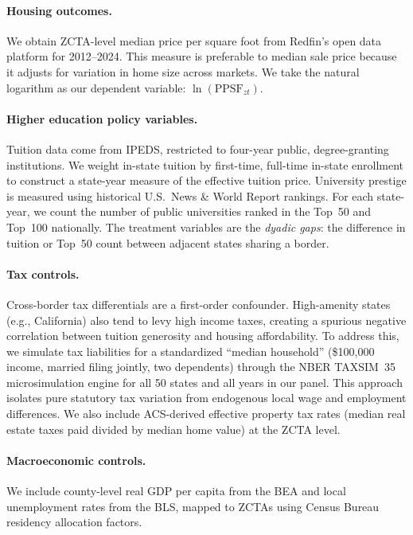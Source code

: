\documentclass[12pt]{article}
\begin{document}
\paragraph{Housing outcomes.} We obtain ZCTA-level median price per square foot from Redfin's open data platform for 2012--2024. This measure is preferable to median sale price because it adjusts for variation in home size across markets. We take the natural logarithm as our dependent variable: $\ln(\text{PPSF}_{zt})$.

\paragraph{Higher education policy variables.} Tuition data come from IPEDS, restricted to four-year public, degree-granting institutions. We weight in-state tuition by first-time, full-time in-state enrollment to construct a state-year measure of the effective tuition price. University prestige is measured using historical U.S.\ News \& World Report rankings. For each state-year, we count the number of public universities ranked in the Top~50 and Top~100 nationally. The treatment variables are the \textit{dyadic gaps}: the difference in tuition or Top~50 count between adjacent states sharing a border.

\paragraph{Tax controls.} Cross-border tax differentials are a first-order confounder. High-amenity states (e.g., California) also tend to levy high income taxes, creating a spurious negative correlation between tuition generosity and housing affordability. To address this, we simulate tax liabilities for a standardized ``median household'' (\$100,000 income, married filing jointly, two dependents) through the NBER TAXSIM~35 microsimulation engine for all 50 states and all years in our panel. This approach isolates pure statutory tax variation from endogenous local wage and employment differences. We also include ACS-derived effective property tax rates (median real estate taxes paid divided by median home value) at the ZCTA level.

\paragraph{Macroeconomic controls.} We include county-level real GDP per capita from the BEA and local unemployment rates from the BLS, mapped to ZCTAs using Census Bureau residency allocation factors.
\end{document}
